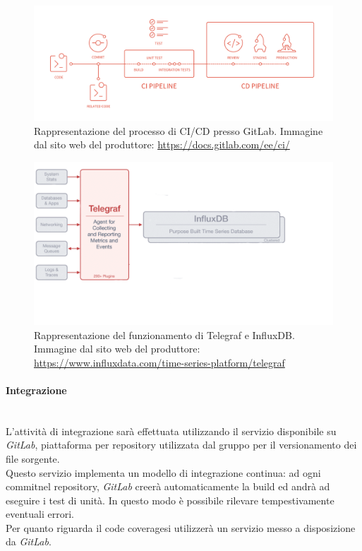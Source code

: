 \begin{figure}[H]
	\begin{center}
		\includegraphics[scale=0.18]{./images/cicd_pipeline_gitlab.png}
		\caption{Rappresentazione del processo di CI/CD presso GitLab. Immagine dal sito web del produttore: \url{https://docs.gitlab.com/ee/ci/}}
	\end{center}
\end{figure}

\begin{figure}[H]
	\begin{center}
		\includegraphics[scale=0.4]{./images/influxTelegraf.png}
		\caption{Rappresentazione del funzionamento di Telegraf e InfluxDB. Immagine dal sito web del produttore: \url{https://www.influxdata.com/time-series-platform/telegraf}}
	\end{center}
\end{figure}

\paragraph{Integrazione}\label{Progettazione_Integrazione}\-\\
L'attività di integrazione sarà effettuata utilizzando il servizio disponibile su \textit{GitLab}, piattaforma per repository utilizzata dal gruppo per il versionamento dei file sorgente.\\
Questo servizio implementa un modello di integrazione continua: ad ogni commit\glossario nel repository\glossario, \textit{GitLab} creerà automaticamente la build ed andrà ad eseguire i test di unità. In questo modo è possibile rilevare tempestivamente eventuali errori.\\
Per quanto riguarda il code coverage\glossario si utilizzerà un servizio messo a disposizione da \textit{GitLab}.\\

